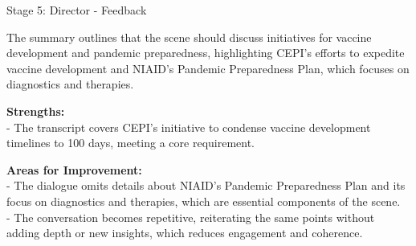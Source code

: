 \begin{figure*}[t]
    \begin{AIbox}{Stage 5: Director - Feedback}
    \parbox[t]{\textwidth}{
    The summary outlines that the scene should discuss initiatives for vaccine development and pandemic preparedness, highlighting CEPI's efforts to expedite vaccine development and NIAID's Pandemic Preparedness Plan, which focuses on diagnostics and therapies.

    \textbf{Strengths:}\\
    - The transcript covers CEPI's initiative to condense vaccine development timelines to 100 days, meeting a core requirement.

    \textbf{Areas for Improvement:}\\
    - The dialogue omits details about NIAID's Pandemic Preparedness Plan and its focus on diagnostics and therapies, which are essential components of the scene.\\
    - The conversation becomes repetitive, reiterating the same points without adding depth or new insights, which reduces engagement and coherence.
    }
    \end{AIbox}
    \caption{Stage 5: Director's feedback on the raw meeting scene, focusing on content gaps and dialogue improvement.}
    \label{fig:stage5_feedback}
\end{figure*}


